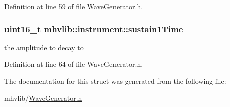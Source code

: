 Definition at line 59 of file Wave\-Generator.\-h.

\hypertarget{structmhvlib_1_1instrument_afc30f5d6ff3a965dc7eca798afca2eb8}{
\subsubsection[{sustain1\-Time}]{\setlength{\rightskip}{0pt plus 5cm}uint16\-\_\-t mhvlib\-::instrument\-::sustain1\-Time}}\label{structmhvlib_1_1instrument_afc30f5d6ff3a965dc7eca798afca2eb8}
the amplitude to decay to 

Definition at line 64 of file Wave\-Generator.\-h.



The documentation for this struct was generated from the following file\-:\begin{DoxyCompactItemize}
\item 
mhvlib/\hyperlink{_wave_generator_8h}{Wave\-Generator.\-h}\end{DoxyCompactItemize}
